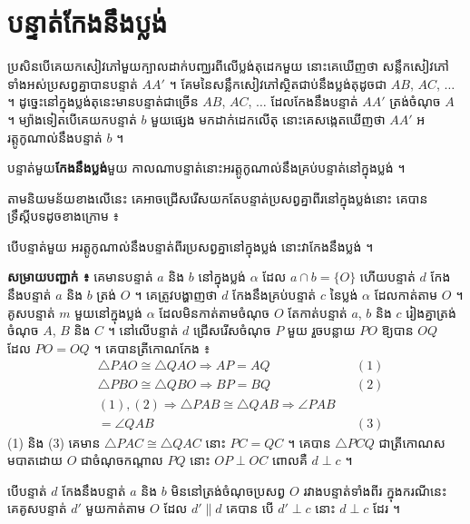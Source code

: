 \section{បន្ទាត់កែងនឹងប្លង់}
ប្រសិនបើគេយកសៀវភៅមួយក្បាលដាក់បញ្ឈរពីលើប្លង់តុដេកមួយ នោះគេឃើញថា សន្លឹកសៀវភៅទាំងអស់ប្រសព្វគ្នាបានបន្ទាត់ $AA'$ ។ គែមនៃសន្លឹកសៀវភៅស្ថិតជាប់នឹងប្លង់តុដូចជា $AB$, $AC$, $\dots$ ។ ដូច្នេះនៅក្នុងប្លង់តុនេះមានបន្ទាត់ជាច្រើន $AB$, $AC$, $\dots$ ដែលកែងនឹងបន្ទាត់ $AA'$ ត្រង់ចំណុច $A$ ។ ម្យ៉ាងទៀតបើគេយកបន្ទាត់ $b$ មួយផ្សេង មកដាក់ដេកលើតុ នោះគេសង្កេតឃើញថា $AA'$ អរត្តូកូណាល់នឹងបន្ទាត់ $b$ ។
\begin{definition}[និយមន័យ]
បន្ទាត់មួយ\textbf{កែងនឹងប្លង់}មួយ កាលណាបន្ទាត់នោះអរត្តូកូណាល់នឹងគ្រប់បន្ទាត់នៅក្នុងប្លង់ ។
\end{definition}
តាមនិយមន័យខាងលើនេះ គេអាចជ្រើសរើសយកតែបន្ទាត់ប្រសព្វគ្នាពីរនៅក្នុងប្លង់នោះ គេបានទ្រឹស្ដីបទដូចខាងក្រោម ៖
\begin{theorem}[ទ្រឹស្ដីបទ ១]
បើបន្ទាត់មួយ អរត្តូកូណាល់នឹងបន្ទាត់ពីរប្រសព្វគ្នានៅក្នុងប្លង់ នោះវាកែងនឹងប្លង់ ។
\end{theorem}
\textbf{សម្រាយបញ្ជាក់ ៖} គេមានបន្ទាត់ $a$ និង $b$ នៅក្នុងប្លង់ $\alpha$ ដែល $a \cap b = \{O\}$ ហើយបន្ទាត់ $d$ កែងនឹងបន្ទាត់ $a$ និង $b$ ត្រង់ $O$ ។ គេត្រូវបង្ហាញថា $d$ កែងនឹងគ្រប់បន្ទាត់ $c$ នៃប្លង់ $\alpha$ ដែលកាត់តាម $O$ ។ គូសបន្ទាត់ $m$ មួយនៅក្នុងប្លង់ $\alpha$ ដែលមិនកាត់តាមចំណុច $O$ តែកាត់បន្ទាត់ $a$, $b$ និង $c$ រៀងគ្នាត្រង់ចំណុច $A$, $B$ និង $C$ ។ នៅលើបន្ទាត់ $d$ ជ្រើសរើសចំណុច $P$ មួយ រួចបន្លាយ $PO$ ឱ្យបាន $OQ$ ដែល $PO = OQ$ ។ គេបានត្រីកោណកែង ៖
\[
\begin{aligned}
&\triangle PAO \cong \triangle QAO \Rightarrow AP = AQ && (1)\\
&\triangle PBO \cong \triangle QBO \Rightarrow BP = BQ && (2)\\
&(1), (2) \Rightarrow \triangle PAB \cong \triangle QAB \Rightarrow \angle PAB\\
&= \angle QAB && (3)
\end{aligned}
\]
(1) និង (3) គេមាន $\triangle PAC \cong \triangle QAC$ នោះ $PC = QC$ ។ គេបាន $\triangle PCQ$ ជាត្រីកោណសមបាតដោយ $O$ ជាចំណុចកណ្ដាល $PQ$ នោះ $OP \perp OC$ ពោលគឺ $d \perp c$ ។

\begin{note}[សម្គាល់]
បើបន្ទាត់ $d$ កែងនឹងបន្ទាត់ $a$ និង $b$ មិននៅត្រង់ចំណុចប្រសព្វ $O$ រវាងបន្ទាត់ទាំងពីរ ក្នុងករណីនេះគេគូសបន្ទាត់ $d'$ មួយកាត់តាម $O$ ដែល $d' \parallel d$ គេបាន បើ $d' \perp c$ នោះ $d \perp c$ ដែរ ។
\end{note}

